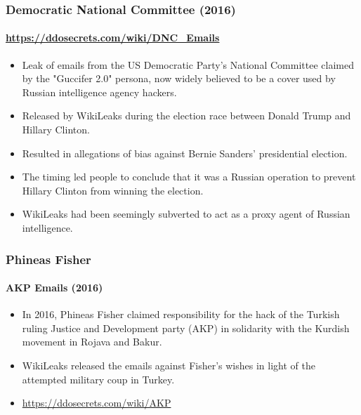 \documentclass[aspectratio=169,usenames,dvipsnames]{beamer}
\begin{document}
\begin{frame}
  \frametitle{Democratic National Committee (2016)}
  \framesubtitle{\url{https://ddosecrets.com/wiki/DNC_Emails}}

  \begin{itemize}[<+->]
    \item Leak of emails from the US Democratic Party's National Committee
      claimed by the "Guccifer 2.0" persona, now widely believed to be a cover
      used by Russian intelligence agency hackers.
    \item Released by WikiLeaks during the election race between Donald Trump
      and Hillary Clinton.
    \item Resulted in allegations of bias against Bernie Sanders' presidential
      election.
    \item The timing led people to conclude that it was a Russian operation to
      prevent Hillary Clinton from winning the election.
    \item WikiLeaks had been seemingly subverted to act as a proxy agent of
      Russian intelligence.
  \end{itemize}

\end{frame}

\begin{frame}
  \frametitle{Phineas Fisher}
  \framesubtitle{AKP Emails (2016)}

  \begin{itemize}[<+->]
    \item In 2016, Phineas Fisher claimed responsibility for the hack of the
      Turkish ruling Justice and Development party (AKP) in solidarity with
      the Kurdish movement in Rojava and Bakur.
    \item WikiLeaks released the emails against Fisher's wishes in light of
      the attempted military coup in Turkey.
    \item \url{https://ddosecrets.com/wiki/AKP}
  \end{itemize}

\end{frame}
\end{document}
